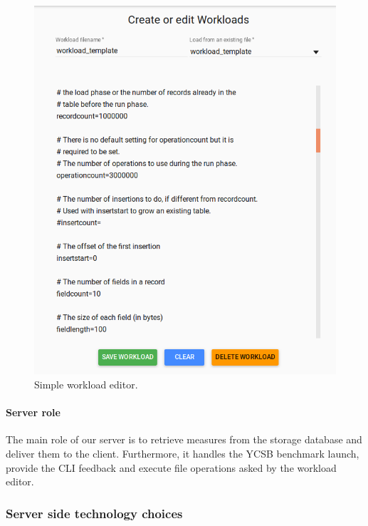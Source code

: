 \documentclass[a4paper,11pt]{report}
\begin{document}
\begin{figure}[ht]
\begin{center}
\includegraphics[width=1\linewidth]{images/workload_editor.png}
\caption{Simple workload editor.}
\label{workload_editor}
\end{center}
\end{figure}

\clearpage

\paragraph{Server role}

The main role of our server is to retrieve measures from the storage database and deliver them to the client. Furthermore, it handles the YCSB benchmark launch, provide the CLI feedback and execute file operations asked by the workload editor. 

\subsubsection{Server side technology choices}
\end{document}
